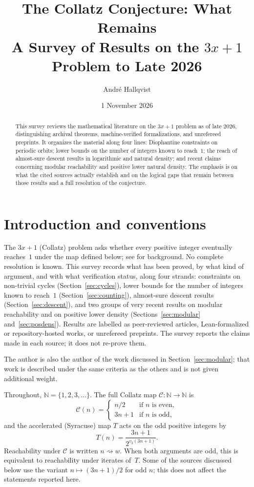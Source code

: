 \documentclass[11pt,reqno,oneside]{amsart}
\title[The Collatz Conjecture: What Remains]{The Collatz Conjecture: What Remains\\[0.4em]\large A Survey of Results on the $3x+1$ Problem to Late 2026}
\author{Andr\'e Hallqvist}
\date{1 November 2026}
\newcommand{\N}{\mathbb{N}}
\newcommand{\C}{\mathcal{C}}
\begin{document}
\pagestyle{plain}

\begin{abstract}
This survey reviews the mathematical literature on the $3x+1$ problem as of late 2026, distinguishing archival theorems, machine-verified formalizations, and unrefereed preprints. It organizes the material along four lines: Diophantine constraints on periodic orbits; lower bounds on the number of integers known to reach~$1$; the reach of almost-sure descent results in logarithmic and natural density; and recent claims concerning modular reachability and positive lower natural density. The emphasis is on what the cited sources actually establish and on the logical gaps that remain between those results and a full resolution of the conjecture.
\end{abstract}

\maketitle

\section{Introduction and conventions}

The $3x+1$ (Collatz) problem asks whether every positive integer eventually reaches~$1$ under the map defined below; see \cite{Lagarias85,Wirsching98} for background. No complete resolution is known. This survey records what has been proved, by what kind of argument, and with what verification status, along four strands: constraints on non-trivial cycles (Section~\ref{sec:cycles}), lower bounds for the number of integers known to reach~$1$ (Section~\ref{sec:counting}), almost-sure descent results (Section~\ref{sec:descent}), and two groups of very recent results on modular reachability and on positive lower density (Sections~\ref{sec:modular} and~\ref{sec:posdens}). Results are labelled as peer-reviewed articles, Lean-formalized or repository-hosted works, or unrefereed preprints. The survey reports the claims made in each source; it does not re-prove them.

The author is also the author of the work discussed in Section~\ref{sec:modular}; that work is described under the same criteria as the others and is not given additional weight.

Throughout, $\N=\{1,2,3,\dots\}$. The full Collatz map $\C:\N\to\N$ is
\[
\C(n)=\begin{cases}
n/2 & \text{if $n$ is even},\\
3n+1 & \text{if $n$ is odd},
\end{cases}
\]
and the accelerated (Syracuse) map $T$ acts on the odd positive integers by
\[
T(n)=\frac{3n+1}{2^{v_2(3n+1)}}.
\]
Reachability under $\C$ is written $n\rightsquigarrow w$. When both arguments are odd, this is equivalent to reachability under iterates of~$T$. Some of the sources discussed below use the variant $n\mapsto(3n+1)/2$ for odd $n$; this does not affect the statements reported here.
\end{document}

